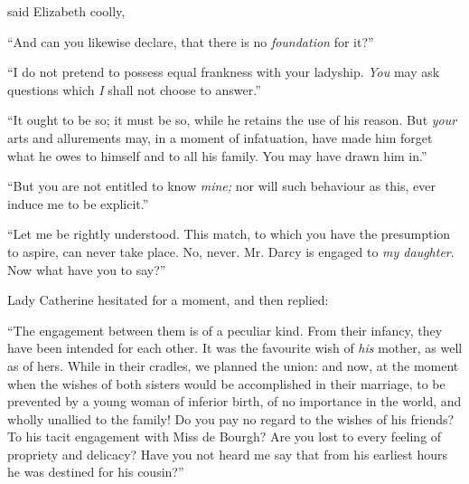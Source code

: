 
 said Elizabeth coolly, 



“And can you likewise declare, that there is no {\em foundation} for it?”

“I do not pretend to possess equal frankness with your ladyship. {\em You} may ask questions which {\em I} shall not choose to answer.”



“It ought to be so; it must be so, while he retains the use of his reason. But {\em your} arts and allurements may, in a moment of infatuation, have made him forget what he owes to himself and to all his family. You may have drawn him in.”



“But you are not entitled to know {\em mine;} nor will such behaviour as this, ever induce me to be explicit.”

“Let me be rightly understood. This match, to which you have the presumption to aspire, can never take place. No, never. Mr. Darcy is engaged to {\em my daughter}. Now what have you to say?”


Lady Catherine hesitated for a moment, and then replied:

“The engagement between them is of a peculiar kind. From their infancy, they have been intended for each other. It was the favourite wish of {\em his} mother, as well as of hers. While in their cradles, we planned the union: and now, at the moment when the wishes of both sisters would be accomplished in their marriage, to be prevented by a young woman of inferior birth, of no importance in the world, and wholly unallied to the family! Do you pay no regard to the wishes of his friends? To his tacit engagement with Miss de Bourgh? Are you lost to every feeling of propriety and delicacy? Have you not heard me say that from his earliest hours he was destined for his cousin?”

